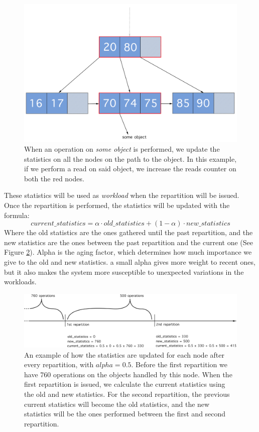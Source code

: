 \begin{figure}[!htb]
  \centering
  \includegraphics[width=\textwidth,height=\textheight,keepaspectratio]{img/b+tree_path.png}
  \caption[caption]{ When an operation on \emph{some object} is performed, we update the statistics on all the nodes on the path to the object. In this example, if we perform a read on said object, we increase the reads counter on both the red nodes.}
  \label{fig:b+tree_path}
\end{figure}

These statistics will be used as \emph{workload} when the repartition will be issued. Once the repartition is performed, the statistics will be updated with the formula:
$$ current\_statistics = \alpha \cdot old\_statistics + (1-\alpha) \cdot new\_statistics $$
Where the old statistics are the ones gathered until the past repartition, and the new statistics are the ones between the past repartition and the current one (See Figure \ref{fig:statistics}).
Alpha is the aging factor, which determines how much importance we give to the old and new statistics. a small alpha gives more weight to recent ones, but it also makes the system more susceptible to unexpected variations in the workloads.

\begin{figure}[!htb]
  \centering
  \includegraphics[width=\textwidth,height=\textheight,keepaspectratio]{img/statistics.png}
  \caption[caption]{An example of how the statistics are updated for each node after every repartition, with $alpha = 0.5$. Before the first repartition we have 760 operations on the objects handled by this node. When the first repartition is issued, we calculate the current statistics using the old and new statistics. For the second repartition, the previous current statistics will become the old statistics, and the new statistics will be the ones performed between the first and second repartition. }
  \label{fig:statistics}
\end{figure}

